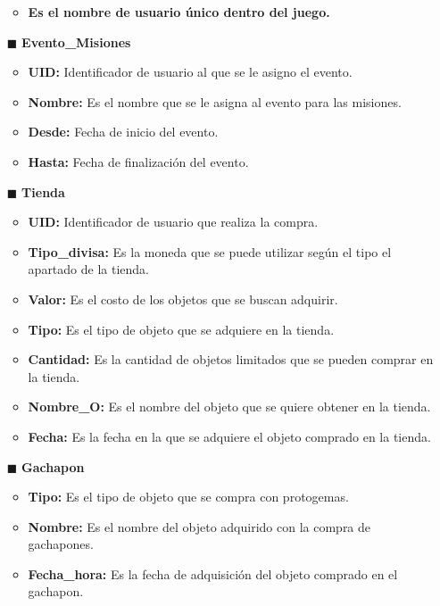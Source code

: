 \documentclass{report}
\begin{document}
\begin{itemize}
\begin{itemize}
            \item \textbf{Es el nombre de usuario único dentro del juego.}
        \end{itemize}
    \item [$\blacksquare$]\textbf{Evento\_Misiones}
        \begin{itemize}
            \item \textbf{UID:} Identificador de usuario al que se le asigno el evento.
            \item \textbf{Nombre:} Es el nombre que se le asigna al evento para las misiones.
            \item \textbf{Desde:} Fecha de inicio del evento.
            \item \textbf{Hasta:} Fecha de finalización del evento.
        \end{itemize}
    \item[$\blacksquare$]\textbf{Tienda}
        \begin{itemize}
            \item \textbf{UID:} Identificador de usuario que realiza la compra.
            \item \textbf{Tipo\_divisa:} Es la moneda que se puede utilizar según el tipo el apartado de la tienda.
            \item \textbf{Valor:} Es el costo de los objetos que se buscan adquirir.
            \item \textbf{Tipo:} Es el tipo de objeto que se adquiere en la tienda.
            \item \textbf{Cantidad:} Es la cantidad de objetos limitados que se pueden comprar en la tienda.
            \item \textbf{Nombre\_O:} Es el nombre del objeto que se quiere obtener en la tienda.
            \item \textbf{Fecha: } Es la fecha en la que se adquiere el objeto comprado en la tienda.
        \end{itemize}
    \item[$\blacksquare$]\textbf{Gachapon}
        \begin{itemize}
            \item \textbf{Tipo:} Es el tipo de objeto que se compra con protogemas.
            \item \textbf{Nombre: }Es el nombre del objeto adquirido con la compra de gachapones.
            \item \textbf{Fecha\_hora:} Es la fecha de adquisición del objeto comprado en el gachapon.
        \end{itemize}

\end{itemize}
\end{document}
